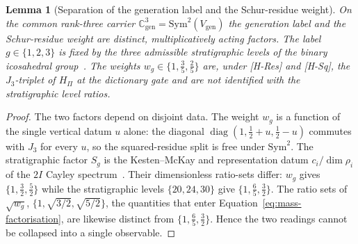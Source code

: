 \documentclass[11pt]{article}
\newtheorem{lemma}{Lemma}
\theoremstyle{definition}
\theoremstyle{remark}
\newcommand{\Cgen}{\mathbb{C}^{3}_{\mathrm{gen}}}
\newcommand{\Hpi}{H_{\Pi}}
\newcommand{\diag}{\operatorname{diag}}
\begin{document}
      \begin{lemma}[Separation of the generation label and the Schur-residue weight]
        \label{lem:separation-label-weight}
        On the common rank-three carrier \(\Cgen = \mathrm{Sym}^{2}(V_{\mathrm{gen}})\) the generation label and the
        Schur-residue weight are distinct, multiplicatively acting factors.
        The label \(g\in\{1,2,3\}\) is fixed by the three admissible stratigraphic levels of the binary
        icosahedral group~\cite{Beau2026a4}.
        The weights \(w_g\in\{1, \tfrac35, \tfrac25\}\) are, under [H-Res] and [H-Sq], the \(J_3\)-triplet of
        \(\Hpi\) at the dictionary gate and are not identified with the stratigraphic level ratios.
      \end{lemma}
      \begin{proof}
        The two factors depend on disjoint data.
        The weight \(w_g\) is a function of the single vertical datum \(u\) alone: the diagonal
        \(\diag(1,\tfrac12+u,\tfrac12-u)\) commutes with \(J_3\) for every \(u\), so the squared-residue split is
        free under \(\mathrm{Sym}^{2}\).
        The stratigraphic factor \(S_g\) is the Kesten--McKay and representation datum \(c_i/\dim\rho_i\) of the
        \(2I\) Cayley spectrum~\cite{Beau2026a5}.
        Their dimensionless ratio-sets differ: \(w_g\) gives \(\{1, \tfrac32, \tfrac52\}\) while the stratigraphic
        levels \(\{20,24,30\}\) give \(\{1, \tfrac65, \tfrac32\}\).
        The ratio sets of \(\sqrt{w_g}\), \(\{1, \sqrt{3/2}, \sqrt{5/2}\}\), the quantities that enter
        Equation~\eqref{eq:mass-factorisation}, are likewise distinct from \(\{1, \tfrac65, \tfrac32\}\).
        Hence the two readings cannot be collapsed into a single observable.
      \end{proof}
\end{document}

